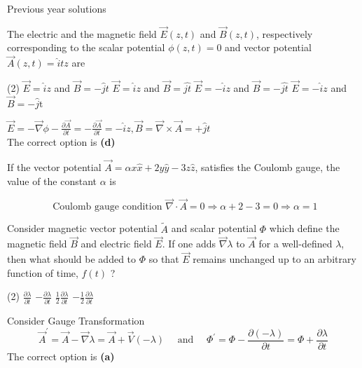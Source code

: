 \newpage
\begin{abox}
	Previous year solutions
	\end{abox}
\begin{enumerate}
	\begin{minipage}{\textwidth}
		\item  The electric and the magnetic field $\vec{E}(z, t)$ and $\vec{B}(z, t)$, respectively corresponding to the scalar potential $\phi(z, t)=0$ and vector potential $\vec{A}(z, t)=\hat{i} t z$ are
	\end{minipage}
	\begin{tasks}(2)
		\task[\textbf{A.}] $\vec{E}=\hat{i} z$ and $\vec{B}=-\hat{j} t$
		\task[\textbf{B.}]$\vec{E}=\hat{i} z$ and $\vec{B}=\hat{j t}$
		\task[\textbf{C.}]$\vec{E}=-\hat{i} z$ and $\vec{B}=-\hat{j t}$
		\task[\textbf{D.}]$\vec{E}=-\hat{i} z$ and $\vec{B}=-\hat{j} \mathrm{t}$
	\end{tasks}
\begin{answer}
	$\vec{E}=-\vec{\nabla} \phi-\frac{\partial \vec{A}}{\partial t}=-\frac{\partial \vec{A}}{\partial t}=-\hat{i} z, \vec{B}=\vec{\nabla} \times \vec{A}=+\hat{j} t$\\
The correct option is \textbf{(d)}
\end{answer}
\begin{minipage}{\textwidth}
	\item If the vector potential $\vec{A}=\alpha x \hat{x}+2 y \hat{y}-3 z \hat{z}$, satisfies the Coulomb gauge, the value of the constant $\alpha$ is
\end{minipage}
\begin{answer}
$$\text { Coulomb gauge condition } \vec{\nabla} \cdot \vec{A}=0 \Rightarrow \alpha+2-3=0 \Rightarrow \alpha=1$$	
\end{answer}
\begin{minipage}{\textwidth}
	\item Consider magnetic vector potential $\tilde{A}$ and scalar potential $\Phi$ which define the magnetic field $\vec{B}$ and electric field $\vec{E}$. If one adds $\vec{\nabla} \lambda$ to $\vec{A}$ for a well-defined $\lambda$, then what should be added to $\Phi$ so that $\vec{E}$ remains unchanged up to an arbitrary function of time, $f(t)$ ?
\end{minipage}
\begin{tasks}(2)
	\task[\textbf{A.}] $\frac{\partial \lambda}{\partial t}$
	\task[\textbf{B.}]$-\frac{\partial \lambda}{\partial t}$
	\task[\textbf{C.}]$\frac{1}{2} \frac{\partial \lambda}{\partial t}$
	\task[\textbf{D.}]$-\frac{1}{2} \frac{\partial \lambda}{\partial t}$
\end{tasks}
\begin{answer}
Consider Gauge Transformation
$$
\vec{A}^{\prime}=\vec{A}-\vec{\nabla} \lambda=\vec{A}+\vec{V}(-\lambda) \quad \text { and } \quad \Phi^{\prime}=\Phi-\frac{\partial(-\lambda)}{\partial t}=\Phi+\frac{\partial \lambda}{\partial t}
$$
The correct option is \textbf{(a)}	
\end{answer}
\end{enumerate}
